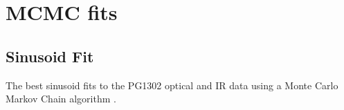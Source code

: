 

\appendix
\section{MCMC fits}
\subsection{Sinusoid Fit}
The best sinusoid fits to the PG1302 optical and IR data using a Monte Carlo Markov Chain algorithm \citep{DFM:2013}.


